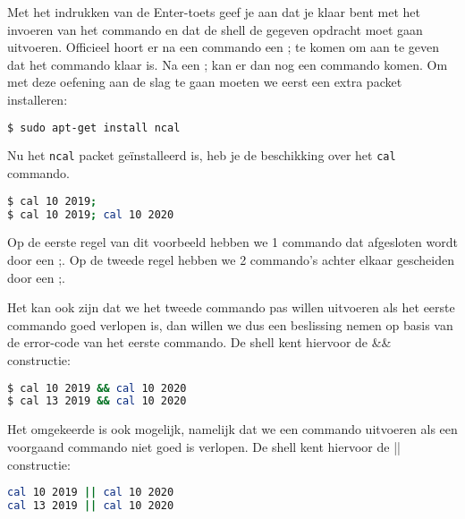 Met het indrukken van de Enter-toets geef je aan dat je klaar bent met het invoeren van het commando en dat de shell de gegeven opdracht moet gaan uitvoeren. Officieel hoort er na een commando een ; te komen om aan te geven dat het commando klaar is. Na een ; kan er dan nog een commando komen. Om met deze oefening aan de slag te gaan moeten we eerst een extra packet installeren:
\begin{lstlisting}[language=bash]
$ sudo apt-get install ncal
\end{lstlisting}
Nu het \texttt{ncal} packet ge\"installeerd is, heb je de beschikking over het \texttt{cal} commando.

\begin{lstlisting}[language=bash]
$ cal 10 2019;
$ cal 10 2019; cal 10 2020
\end{lstlisting}
Op de eerste regel van dit voorbeeld hebben we 1 commando dat afgesloten wordt door een ;. Op de tweede regel hebben we 2 commando's achter elkaar gescheiden door een ;.

Het kan ook zijn dat we het tweede commando pas willen uitvoeren als het eerste commando goed verlopen is, dan willen we dus een beslissing nemen op basis van de error-code van het eerste commando. De shell kent hiervoor de \&\&\index{\&\&} constructie:
\begin{lstlisting}[language=bash]
$ cal 10 2019 && cal 10 2020
$ cal 13 2019 && cal 10 2020
\end{lstlisting}

Het omgekeerde is ook mogelijk, namelijk dat we een commando uitvoeren als een voorgaand commando niet goed is verlopen. De shell kent hiervoor de ||\index{||} constructie:
\begin{lstlisting}[language=bash]
cal 10 2019 || cal 10 2020
cal 13 2019 || cal 10 2020
\end{lstlisting}

